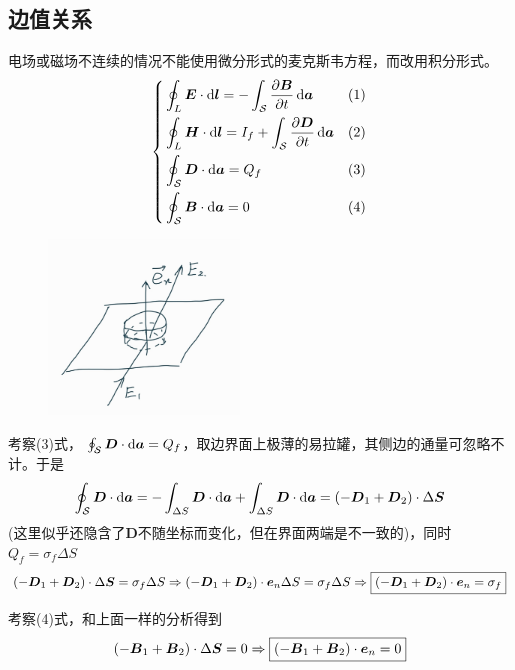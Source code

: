 \documentclass{mynote}
\begin{document}
\subsection{边值关系}
电场或磁场不连续的情况不能使用微分形式的麦克斯韦方程，而改用积分形式。
\[
\left\{
    \begin{aligned}
    & \oint_L \boldsymbol{E} \cdot \mathop{}\!\mathrm{d} \boldsymbol{l} = - \int_{\mathcal{S}} \dfrac{\partial \boldsymbol{B}}{\partial t} \mathop{}\!\mathrm{d} \boldsymbol{a} & (1) \\
    & \oint_L \boldsymbol{H} \cdot \mathop{}\!\mathrm{d} \boldsymbol{l} = I_f + \int_{\mathcal{S}} \dfrac{\partial \boldsymbol{D}}{\partial t} \mathop{}\!\mathrm{d} \boldsymbol{a} & (2)\\
    & \oint_{\mathcal{S}} \boldsymbol{D} \cdot \mathop{}\!\mathrm{d} \boldsymbol{a} = Q_f & (3)\\
    & \oint_{\mathcal{S}} \boldsymbol{B} \cdot \mathop{}\!\mathrm{d} \boldsymbol{a} = 0 & (4)
    \end{aligned} 
\right.    
\]



\begin{figure}[H]
    \centering
    \includegraphics[width=2in]{./Imgs/QQ_Image_1664287192148.jpg}
\end{figure}


\begin{proposition}
    考察(3)式， $ \oint_{\mathcal{S}} \boldsymbol{D} \cdot \mathop{}\!\mathrm{d} \boldsymbol{a} = Q_f$，取边界面上极薄的易拉罐，其侧边的通量可忽略不计。于是
    \[
        \oint_{\mathcal{S}} \boldsymbol{D} \cdot \mathop{}\!\mathrm{d} \boldsymbol{a} = - \int_{\Delta S} \boldsymbol{D} \cdot \mathop{}\!\mathrm{d} \boldsymbol{a} + \int_{\Delta S} \boldsymbol{D} \cdot \mathop{}\!\mathrm{d} \boldsymbol{a} = (-\boldsymbol{D}_1  + \boldsymbol{D}_2) \cdot \Delta \boldsymbol{S}
    \]
    (这里似乎还隐含了$\bm{D}$不随坐标而变化，但在界面两端是不一致的)，同时$Q_f = \sigma_f \Delta S$
    \[
        (-\boldsymbol{D}_1  + \boldsymbol{D}_2) \cdot \Delta \boldsymbol{S} = \sigma_f \Delta S \Rightarrow (-\boldsymbol{D}_1  + \boldsymbol{D}_2) \cdot \boldsymbol{e}_n \Delta S = \sigma_f \Delta S \Rightarrow \boxed{(-\boldsymbol{D}_1  + \boldsymbol{D}_2) \cdot \boldsymbol{e}_n = \sigma_f}
    \]
\end{proposition}




\begin{proposition}
    考察(4)式，和上面一样的分析得到
    \[
        (-\boldsymbol{B}_1  + \boldsymbol{B}_2) \cdot \Delta \boldsymbol{S} = 0 \Rightarrow     \boxed{(-\boldsymbol{B}_1  + \boldsymbol{B}_2) \cdot \boldsymbol{e}_n = 0}
    \]
\end{proposition}
\end{document}

